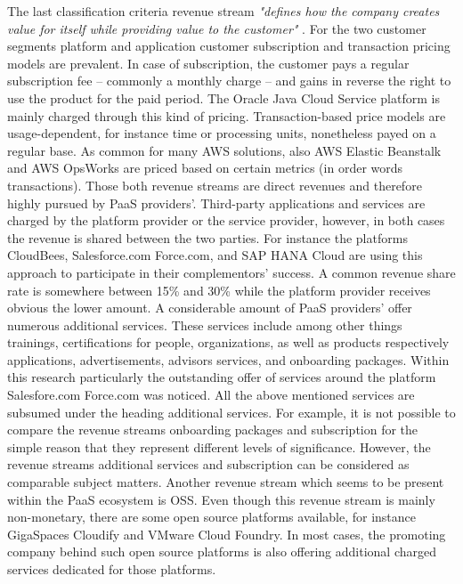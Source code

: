 The last classification criteria revenue stream \textit{"defines how the company creates value for itself while providing value to the customer"} \citep[p. 53]{Johnson2008}. For the two customer segments platform and application customer subscription and transaction pricing models are prevalent. In case of subscription, the customer pays a regular subscription fee -- commonly a monthly charge -- and gains in reverse the right to use the product for the paid period. The Oracle Java Cloud Service platform is mainly charged through this kind of pricing. Transaction-based price models are usage-dependent, for instance time or processing units, nonetheless payed on a regular base. As common for many \ac{AWS} solutions, also \ac{AWS} Elastic Beanstalk and \ac{AWS} OpsWorks are priced based on certain metrics (in order words transactions). Those both revenue streams are direct revenues and therefore highly pursued by \ac{PaaS} providers'. Third-party applications and services are charged by the platform provider or the service provider, however, in both cases the revenue is shared between the two parties. For instance the platforms CloudBees, Salesforce.com Force.com, and SAP HANA Cloud are using this approach to participate in their complementors' success. A common revenue share rate is somewhere between 15\% and 30\% while the platform provider receives obvious the lower amount. A considerable amount of \ac{PaaS} providers' offer numerous additional services. These services include among other things trainings, certifications for people, organizations, as well as products respectively applications, advertisements, advisors services, and onboarding packages. Within this research particularly the outstanding offer of services around the platform Salesfore.com Force.com was noticed. All the above mentioned services are subsumed under the heading additional services. For example, it is not possible to compare the revenue streams onboarding packages and subscription for the simple reason that they represent different levels of significance. However, the revenue streams additional services and subscription can be considered as comparable subject matters. Another revenue stream which seems to be present within the \ac{PaaS} ecosystem is \ac{OSS}. Even though this revenue stream is mainly non-monetary, there are some open source platforms available, for instance GigaSpaces Cloudify and VMware Cloud Foundry. In most cases, the promoting company behind such open source platforms is also offering additional charged services dedicated for those platforms.

